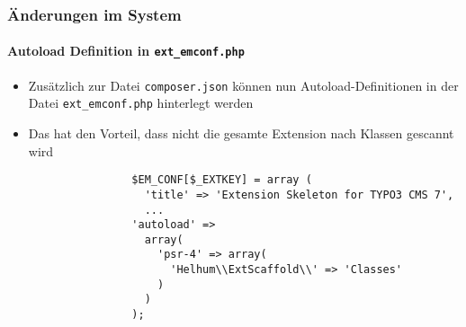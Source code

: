 \begin{frame}[fragile]
	\frametitle{Änderungen im System}
	\framesubtitle{Autoload Definition in \texttt{ext\_emconf.php}}

	\lstset{basicstyle=\tiny\ttfamily}

	\begin{itemize}

		\item Zusätzlich zur Datei \texttt{composer.json} können nun Autoload-Definitionen
			in der Datei \texttt{ext\_emconf.php} hinterlegt werden

		\item Das hat den Vorteil, dass nicht die gesamte Extension nach Klassen gescannt wird

			\begin{lstlisting}
				$EM_CONF[$_EXTKEY] = array (
				  'title' => 'Extension Skeleton for TYPO3 CMS 7',
				  ...
				'autoload' =>
				  array(
				    'psr-4' => array(
				      'Helhum\\ExtScaffold\\' => 'Classes'
				    )
				  )
				);
			\end{lstlisting}

	\end{itemize}

\end{frame}

